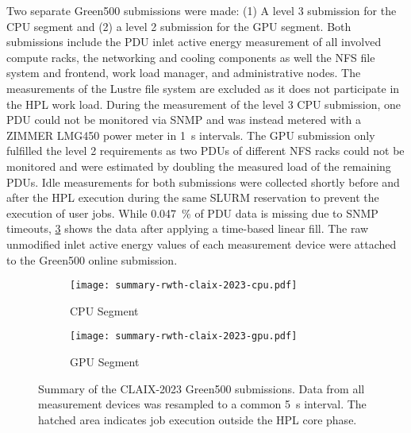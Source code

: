 Two separate Green500 submissions were made: (1) A level 3 submission for the CPU segment and (2) a level 2 submission for the GPU segment.
Both submissions include the \ac{PDU} inlet active energy measurement of all involved compute racks, the networking and cooling components as well the NFS file system and frontend, work load manager, and administrative nodes.
The measurements of the Lustre file system are excluded as it does not participate in the HPL work load.
During the measurement of the level 3 CPU submission, one \ac{PDU} could not be monitored via SNMP and was instead metered with a ZIMMER LMG450 power meter in \SI{1}{\second} intervals.
The GPU submission only fulfilled the level 2 requirements as two \acp{PDU} of different NFS racks could not be monitored and were estimated by doubling the measured load of the remaining \acp{PDU}.
Idle measurements for both submissions were collected shortly before and after the HPL execution during the same SLURM reservation to prevent the execution of user jobs.
While \SI{0.047}{\percent} of \ac{PDU} data is missing due to SNMP timeouts, \cref{fig:summary-rwth-claix-2023} shows the data after applying a time-based linear fill.
The raw unmodified inlet active energy values of each measurement device were attached to the Green500 online submission.

\begin{figure}[htbp]
    \centering
    \hfill
    \begin{subfigure}{0.45\textwidth}
        \centering
        \texttt{[image: summary-rwth-claix-2023-cpu.pdf]}
        \caption{CPU Segment}
        \label{fig:summary-rwth-claix-2023-cpu}
    \end{subfigure}
    \hfill
    \begin{subfigure}{0.45\textwidth}
        \centering
        \texttt{[image: summary-rwth-claix-2023-gpu.pdf]}
        \caption{GPU Segment}
        \label{fig:summary-rwth-claix-2023-gpu}
    \end{subfigure}
    \hfill
    \caption{Summary of the CLAIX-2023 Green500 submissions. Data from all measurement devices was resampled to a common \SI{5}{\second} interval. The hatched area indicates job execution outside the HPL core phase.}
    \label{fig:summary-rwth-claix-2023}
\end{figure}
